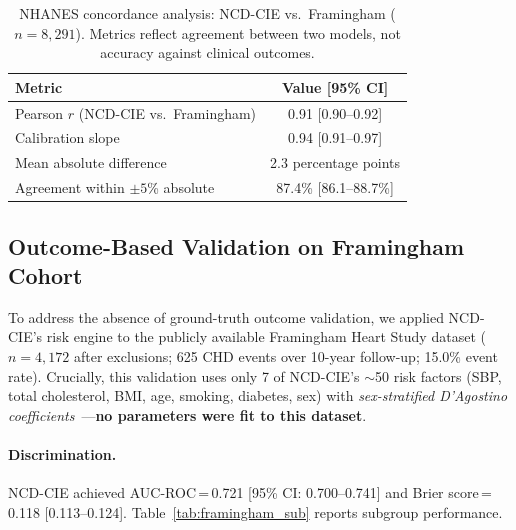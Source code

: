 \documentclass[runningheads]{llncs}
\begin{document}
\begin{table}[t]
\centering
\caption{NHANES concordance analysis: NCD-CIE vs.\ Framingham
($n = 8{,}291$).  Metrics reflect agreement between two models,
not accuracy against clinical outcomes.}
\label{tab:nhanes}
\small
\begin{tabular}{@{}lc@{}}
\toprule
\textbf{Metric} & \textbf{Value [95\% CI]} \\
\midrule
Pearson $r$ (NCD-CIE vs.\ Framingham) & 0.91 [0.90--0.92] \\
Calibration slope                       & 0.94 [0.91--0.97] \\
Mean absolute difference                & 2.3 percentage points \\
Agreement within $\pm 5$\% absolute     & 87.4\% [86.1--88.7\%] \\
\bottomrule
\end{tabular}
\end{table}

\subsection{Outcome-Based Validation on Framingham Cohort}\label{sec:framingham}

To address the absence of ground-truth outcome validation, we applied
NCD-CIE's risk engine to the publicly available Framingham Heart Study
dataset ($n = 4{,}172$ after exclusions; 625 CHD events over 10-year
follow-up; 15.0\% event rate).  Crucially, this validation uses only
7 of NCD-CIE's ${\sim}$50 risk factors (SBP, total cholesterol, BMI,
age, smoking, diabetes, sex) with \emph{sex-stratified D'Agostino
coefficients}~\cite{dagostino2008}---\textbf{no parameters were fit
to this dataset}.

\paragraph{Discrimination.}
NCD-CIE achieved AUC-ROC\,=\,0.721 [95\% CI: 0.700--0.741] and
Brier score\,=\,0.118 [0.113--0.124].  Table~\ref{tab:framingham_sub}
reports subgroup performance.
\end{document}

